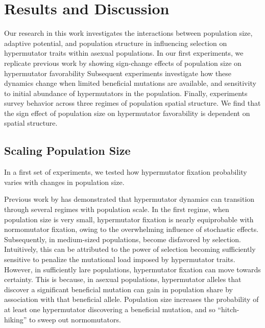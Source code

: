 \section{Results and Discussion} \label{sec:results}

Our research in this work investigates the interactions between population size, adaptive potential, and population structure in influencing selection on hypermutator traits within asexual populations.
In our first experiments, we replicate previous work by \citet{raynes2018sign} showing sign-change effects of population size on hypermutator favorability
Subsequent experiments investigate how these dynamics change when limited beneficial mutations are available, and sensitivity to initial abundance of hypermutators in the population.
Finally, experiments survey behavior across three regimes of population spatial structure.
We find that the sign effect of population size on hypermutator favorability is dependent on spatial structure.

\subsection{Scaling Population Size}
\label{sec:scaling-population-size}

In a first set of experiments, we tested how hypermutator fixation probability varies with changes in population size.

Previous work by \citet{raynes2018sign} has demonstrated that hypermutator dynamics can transition through several regimes with population scale.
In the first regime, when population size is very small, hypermutator fixation is nearly equiprobable with normomutator fixation, owing to the overwhelming influence of stochastic effects.
Subsequently, in medium-sized populations, become disfavored by selection.
Intuitively, this can be attributed to the power of selection becoming sufficiently sensitive to penalize the mutational load imposed by hypermutator traits.
However, in sufficiently lare populations, hypermutator fixation can move towards certainty.
This is because, in asexual populations, hypermutator alleles that discover a significant beneficial mutation can gain in population share by association with that beneficial allele.
Population size increases the probability of at least one hypermutator discovering a beneficial mutation, and so ``hitch-hiking'' to sweep out normomutators.



